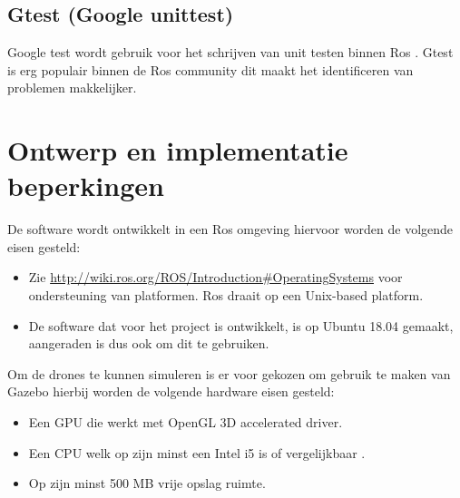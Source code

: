 \documentclass[a4paper, 11pt, oneside]{report}
\begin{document}
\subsection{Gtest (Google unittest)}
\label{inleiding:werkomgeving:gtest}

Google test wordt gebruik voor het schrijven van unit testen binnen Ros \cite{googletest}. Gtest is erg populair binnen de Ros community dit maakt het identificeren van problemen makkelijker. 




\section{Ontwerp en implementatie beperkingen}
\label{inleiding:ontwerpberkingen}

De software wordt ontwikkelt in een Ros omgeving hiervoor worden de volgende eisen gesteld:
\begin{itemize}
	\item  Zie \href{http://wiki.ros.org/ROS/Introduction\#Operating\_Systems}{http://wiki.ros.org/ROS/Introduction\#Operating\textunderscore Systems} voor ondersteuning van platformen. Ros draait op een Unix-based platform.
	\item De software dat voor het project is ontwikkelt, is op Ubuntu 18.04 gemaakt, aangeraden is dus ook om dit te gebruiken.
\end{itemize}

Om de drones te kunnen simuleren is er voor gekozen om gebruik te maken van Gazebo hierbij worden de volgende hardware eisen gesteld:

\begin{itemize}
	\item Een GPU die werkt met OpenGL 3D accelerated driver.
	\item Een CPU welk op zijn minst een Intel i5 is of vergelijkbaar \cite{gazeborequirements}. 
	\item Op zijn minst 500 MB vrije opslag ruimte.
\end{itemize}
\end{document}
